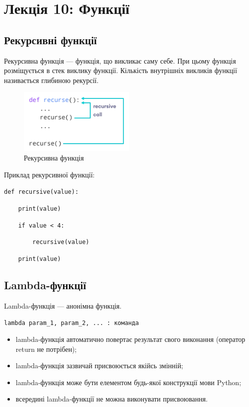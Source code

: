 \section{Лекція 10: Функції}
 
 \subsection{Рекурсивні функції} 
\begin{frame}
Рекурсивна функція — функція, що викликає саму себе. При цьому функція розміщується в стек виклику функції. Кількість внутрішніх викликів функції називається глибиною рекурсії.
\begin{figure}
  \begin{center}
    \includegraphics[width=0.5\textwidth,height=0.5\textheight]{pictures/recursion.png}
  \caption{Рекурсивна функція}
\label{function}
  \end{center}
\end{figure}
\end{frame}

\begin{frame}
Приклад рекурсивної функції:

\vspace{1cm}

\texttt{def recursive(value):}

\texttt{~~~~print(value)}

\texttt{~~~~if value < 4:}

\texttt{~~~~~~~~recursive(value)}

\texttt{~~~~print(value)}

\end{frame}

\subsection{Lambda-функції} 
\begin{frame}
Lambda-функція — анонімна функція.

\Large{\texttt{lambda param\_1, param\_2, ... : команда}}

\normalsize
\begin{itemize}
  \item lambda-функція автоматично повертає результат свого виконання (оператор return не потрібен);
  \item lambda-функція зазвичай присвоюється якійсь змінній; 
  \item lambda-функція може бути елементом будь-якої конструкції мови Python;
  \item всередині lambda-функції не можна виконувати присвоювання.
\end{itemize}

\end{frame}

